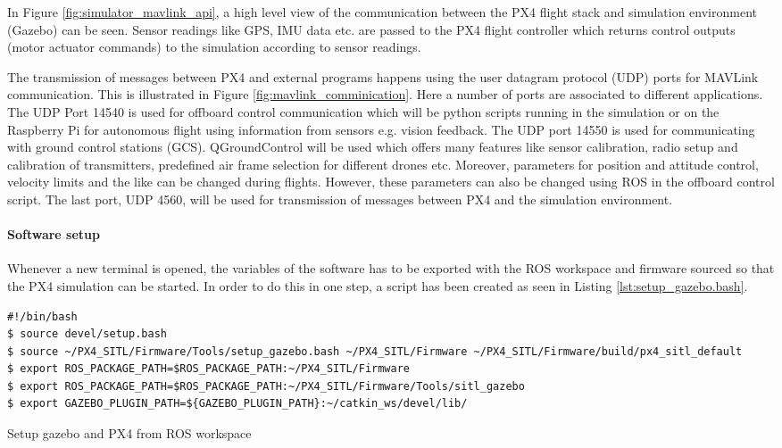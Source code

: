 \documentclass[../Head/report.tex]{subfiles}
\begin{document}
In Figure \ref{fig:simulator_mavlink_api}, a high level view of the communication between the PX4 flight stack and simulation environment (Gazebo) can be seen. Sensor readings like GPS, IMU data etc. are passed to the PX4 flight controller which returns control outputs (motor actuator commands) to the simulation according to sensor readings. 

The transmission of messages between PX4 and external programs happens using  the user datagram protocol (UDP) ports for MAVLink communication. This is illustrated in Figure \ref{fig:mavlink_comminication}. Here a number of ports are associated to different applications. The UDP Port 14540 is used for offboard control communication which will be python scripts running in the simulation or on the Raspberry Pi for autonomous flight using information from sensors e.g. vision feedback. The UDP port 14550 is used for communicating with ground control stations (GCS). QGroundControl will be used which offers many features like sensor calibration, radio setup and calibration of transmitters, predefined air frame selection for different drones etc. Moreover, parameters for position and attitude control, velocity limits and the like can be changed during flights. However, these parameters can also be changed using ROS in the offboard control script. The last port, UDP 4560, will be used for transmission of messages between PX4 and the simulation environment.

\paragraph{Software setup}
\label{sec:software_setup_px4}

Whenever a new terminal is opened, the variables of the software has to be exported with the ROS workspace and firmware sourced so that the PX4 simulation can be started. In order to do this in one step, a script has been created as seen in Listing \ref{lst:setup_gazebo.bash}. 

\begin{listing}[H] 
\begin{tcolorbox}[
    enhanced,
    attach boxed title to top left={xshift=6mm,yshift=-3mm},
    colback=lightgreen!20,
    colframe=lightgreen,
    fonttitle=\bfseries\color{black},
]
\begin{verbatim}
#!/bin/bash
$ source devel/setup.bash
$ source ~/PX4_SITL/Firmware/Tools/setup_gazebo.bash ~/PX4_SITL/Firmware ~/PX4_SITL/Firmware/build/px4_sitl_default
$ export ROS_PACKAGE_PATH=$ROS_PACKAGE_PATH:~/PX4_SITL/Firmware
$ export ROS_PACKAGE_PATH=$ROS_PACKAGE_PATH:~/PX4_SITL/Firmware/Tools/sitl_gazebo
$ export GAZEBO_PLUGIN_PATH=${GAZEBO_PLUGIN_PATH}:~/catkin_ws/devel/lib/
\end{verbatim}
\end{tcolorbox}
\caption{Setup gazebo and PX4 from ROS workspace}
\label{lst:setup_gazebo.bash}    
\end{listing}  
\end{document}
